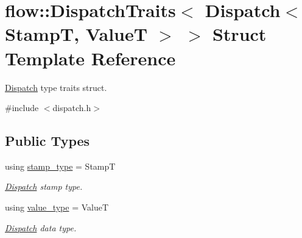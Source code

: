\hypertarget{structflow_1_1_dispatch_traits_3_01_dispatch_3_01_stamp_t_00_01_value_t_01_4_01_4}{}\section{flow\+:\+:Dispatch\+Traits$<$ Dispatch$<$ StampT, ValueT $>$ $>$ Struct Template Reference}
\label{structflow_1_1_dispatch_traits_3_01_dispatch_3_01_stamp_t_00_01_value_t_01_4_01_4}


\hyperlink{classflow_1_1_dispatch}{Dispatch} type traits struct.  




{\ttfamily \#include $<$dispatch.\+h$>$}

\subsection*{Public Types}
\begin{DoxyCompactItemize}
\item 
\mbox{\label{structflow_1_1_dispatch_traits_3_01_dispatch_3_01_stamp_t_00_01_value_t_01_4_01_4_ae654e3252f6e1e479144a94d6388aabb}} 
using \hyperlink{structflow_1_1_dispatch_traits_3_01_dispatch_3_01_stamp_t_00_01_value_t_01_4_01_4_ae654e3252f6e1e479144a94d6388aabb}{stamp\+\_\+type} = StampT
\begin{DoxyCompactList}\small\item\em \hyperlink{classflow_1_1_dispatch}{Dispatch} stamp type. \end{DoxyCompactList}\item 
\mbox{\label{structflow_1_1_dispatch_traits_3_01_dispatch_3_01_stamp_t_00_01_value_t_01_4_01_4_a7e664bd9092a266602268637275cc4d7}} 
using \hyperlink{structflow_1_1_dispatch_traits_3_01_dispatch_3_01_stamp_t_00_01_value_t_01_4_01_4_a7e664bd9092a266602268637275cc4d7}{value\+\_\+type} = ValueT
\begin{DoxyCompactList}\small\item\em \hyperlink{classflow_1_1_dispatch}{Dispatch} data type. \end{DoxyCompactList}\end{DoxyCompactItemize}


